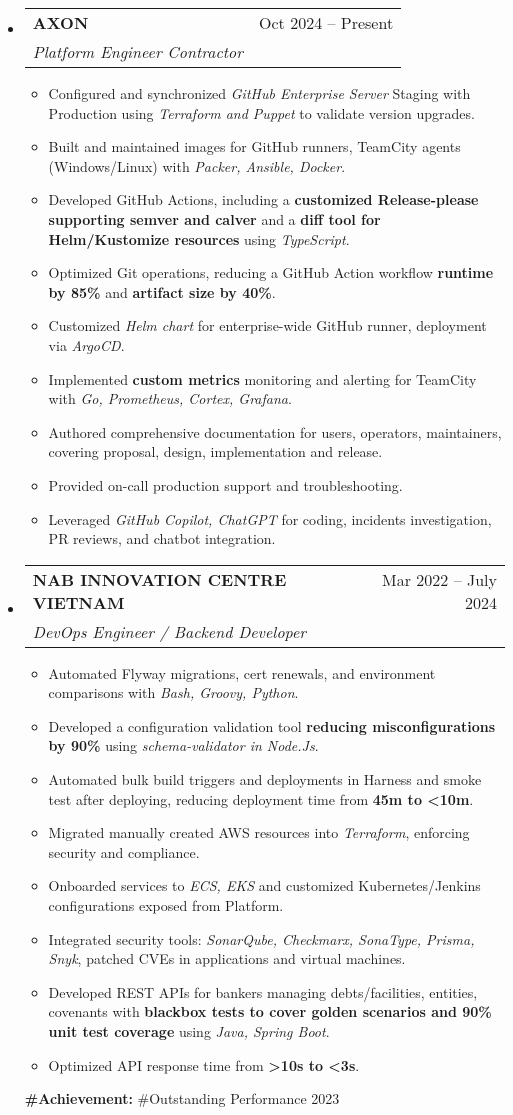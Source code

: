 \documentclass[letterpaper,12pt]{article}[leftmargin=*]
\makeatletter
\def \entryspacing {5pt}
\newcommand{\resumeEntryStart}{\begin{itemize}[leftmargin=2.5mm]}
\newcommand{\resumeEntryEnd}{\end{itemize}\vspace{\entryspacing}}
\newcommand{\resumeItemListStart}{\begin{itemize}[leftmargin=4.5mm]}
\newcommand{\resumeItemListEnd}{\end{itemize}}
\newcommand{\resumeItem}[1]{
  \item\small{
    {#1 \vspace{-2pt}}
  }
}
\newcommand{\resumeEntryTSDL}[4]{
  \vspace{-1pt}\item[]
    \begin{tabularx}{0.97\textwidth}{X@{\hspace{60pt}}r}
      \textbf{\color{primary}#1} & {\firabook\color{accent}\small#2} \\
      \textit{\color{accent}\small#3} & {\firabook\color{accent}\small#4} \\
    \end{tabularx}\vspace{-6pt}
}
\makeatother
\begin{document}
  \resumeEntryStart
    \resumeEntryTSDL
      {AXON}{Oct 2024 -- Present}
      {Platform Engineer Contractor}{}
    \resumeItemListStart
      \resumeItem {Configured and synchronized \textit{GitHub Enterprise Server} Staging with Production using \textit{Terraform and Puppet} to validate version upgrades.}
      \resumeItem {Built and maintained images for GitHub runners, TeamCity agents (Windows/Linux) with \textit{Packer, Ansible, Docker}.}
      \resumeItem {Developed GitHub Actions, including a \textbf{customized Release-please supporting semver and calver} and a \textbf{diff tool for Helm/Kustomize resources} using \textit{TypeScript}.}
      \resumeItem {Optimized Git operations, reducing a GitHub Action workflow \textbf{runtime by 85\%} and \textbf{artifact size by 40\%}.}
      \resumeItem {Customized \textit{Helm chart} for enterprise-wide GitHub runner, deployment via \textit{ArgoCD}.}
      \resumeItem {Implemented \textbf{custom metrics} monitoring and alerting for TeamCity with \textit{Go, Prometheus, Cortex, Grafana}.}
      \resumeItem {Authored comprehensive documentation for users, operators, maintainers, covering proposal, design, implementation and release.}
      \resumeItem {Provided on-call production support and troubleshooting.}
      \resumeItem {Leveraged \textit{GitHub Copilot, ChatGPT} for coding, incidents investigation, PR reviews, and chatbot integration.}
    \resumeItemListEnd
  \resumeEntryEnd

  \resumeEntryStart
    \resumeEntryTSDL
      {NAB INNOVATION CENTRE VIETNAM}{Mar 2022 -- July 2024}
      {DevOps Engineer / Backend Developer}{}
    \resumeItemListStart
      \resumeItem {Automated Flyway migrations, cert renewals, and environment comparisons with \textit{Bash, Groovy, Python}.}
      \resumeItem {Developed a configuration validation tool \textbf{reducing misconfigurations by 90\%} using \textit{schema-validator in Node.Js}.}
      \resumeItem {Automated bulk build triggers and deployments in Harness and smoke test after deploying, reducing deployment time from \textbf{45m to <10m}.}
      \resumeItem {Migrated manually created AWS resources into \textit{Terraform}, enforcing security and compliance.}
      \resumeItem {Onboarded services to \textit{ECS, EKS} and customized Kubernetes/Jenkins configurations exposed from Platform.}
      \resumeItem {Integrated security tools: \textit{SonarQube, Checkmarx, SonaType, Prisma, Snyk}, patched CVEs in applications and virtual machines.}
      \resumeItem {Developed REST APIs for bankers managing debts/facilities, entities, covenants with \textbf{blackbox tests to cover golden scenarios and 90\% unit test coverage} using \textit{Java, Spring Boot}.}
      \resumeItem {Optimized API response time from \textbf{>10s to <3s}.}
    \resumeItemListEnd
    \textbf{\color{primary}\small#Achievement: }{\small#Outstanding Performance 2023}
  \resumeEntryEnd
\end{document}
